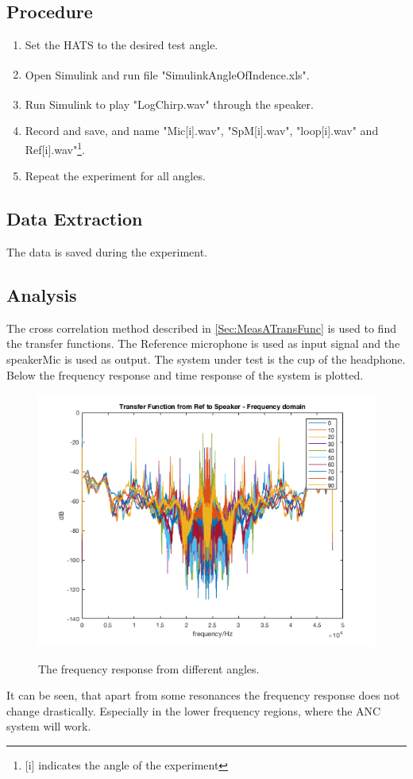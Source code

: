 \subsection{Procedure}
\begin{enumerate}
	\item Set the HATS to the desired test angle. 
	\item Open Simulink\textsuperscript{\textregistered} and run file "SimulinkAngleOfIndence.xls".
	\item Run Simulink\textsuperscript{\textregistered} to play "LogChirp.wav" through the speaker.
	\item Record and save, and name "Mic[i].wav", "SpM[i].wav", "loop[i].wav" and Ref[i].wav"\footnote{[i] indicates the angle of the experiment}.
	\item Repeat the experiment for all angles.
\end{enumerate}

\subsection{Data Extraction}
The data is saved during the experiment.

\subsection{Analysis}
The cross correlation method described in \autoref{Sec:MeasATransFunc} is used to find the transfer functions. The Reference microphone is used as input signal and the speakerMic is used as output. The system under test is the cup of the headphone. 
Below the frequency response and time response of the system is plotted. 
\begin{figure}[H]
	\includegraphics[width=\textwidth]{../Journal/Experiments/AngleOfIncidence/TransRef2Speaker.png}
	\label{Fig:AngOfIncFreq}
	\caption{The frequency response from different angles.}
\end{figure}
It can be seen, that apart from some resonances the frequency response does not change drastically. Especially in the lower frequency regions, where the ANC system will work. 

